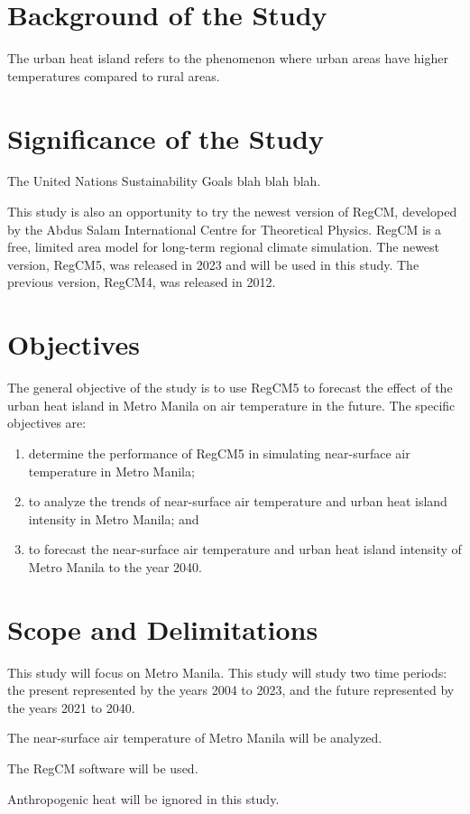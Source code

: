 \section{Background of the Study}
	The urban heat island refers to the phenomenon where urban areas have higher temperatures compared to rural areas.
	
\section{Significance of the Study}
	The United Nations Sustainability Goals blah blah blah.
	
	This study is also an opportunity to try the newest version of RegCM, developed by the Abdus Salam International Centre for Theoretical Physics.
	RegCM is a free, limited area model for long-term regional climate simulation.
	The newest version, RegCM5, was released in 2023 and will be used in this study. The previous version, RegCM4, was released in 2012.
	

\section{Objectives}
	The general objective of the study is to use RegCM5 to forecast the effect of the urban heat island in Metro Manila on air temperature in the future.
	The specific objectives are:
	\begin{enumerate}
		\item determine the performance of RegCM5 in simulating near-surface air temperature in Metro Manila;
		\item to analyze the trends of near-surface air temperature and urban heat island intensity in Metro Manila; and
		\item to forecast the near-surface air temperature and urban heat island intensity of Metro Manila to the year 2040.
		
	\end{enumerate}
	

\section{Scope and Delimitations}
	This study will focus on Metro Manila.
	This study will study two time periods: 
		the present represented by the years 2004 to 2023, 
		and the future represented by the years 2021 to 2040.
	
	The near-surface air temperature of Metro Manila will be analyzed.
	
	The RegCM software will be used.
	
	Anthropogenic heat will be ignored in this study. 